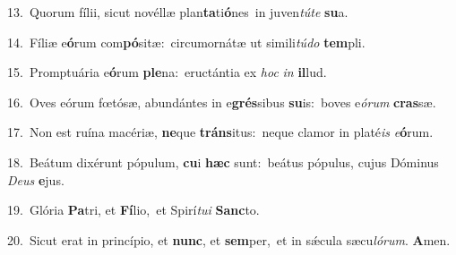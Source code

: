 {\numbfont\textcolor{\numbcolor}{13.}}~Quorum fílii, sicut novéllæ plan\-\textbf{ta}\-ti\-\textbf{ó}\-nes~\star in juven\-\textit{tú}\-\textit{te} \textbf{su}\-a.\par
{\numbfont\textcolor{\numbcolor}{14.}}~Fíliæ e\-\textbf{ó}\-rum com\-\textbf{pó}\-sitæ:~\star circumornátæ ut simili\-\textit{tú}\-\textit{do} \textbf{tem}\-pli.\par
{\numbfont\textcolor{\numbcolor}{15.}}~Promptuária e\-\textbf{ó}\-rum \textbf{ple}\-na:~\star eructántia ex \textit{hoc} \textit{in} \textbf{il}\-lud.\par
{\numbfont\textcolor{\numbcolor}{16.}}~Oves eórum fœtósæ, abundántes in e\-\textbf{grés}\-sibus \textbf{su}\-is:~\star boves e\-\textit{ó}\-\textit{rum} \textbf{cras}\-sæ.\par
{\numbfont\textcolor{\numbcolor}{17.}}~Non est ruína macériæ, \textbf{ne}\-que \textbf{tráns}\-itus:~\star neque clamor in platé\textit{is} \textit{e}\-\textbf{ó}rum.\par
{\numbfont\textcolor{\numbcolor}{18.}}~Beátum dixérunt pópulum, \textbf{cu}\-i \textbf{hæc} sunt:~\star beátus pópulus, cujus Dóminus \textit{De}\-\textit{us} \textbf{e}\-jus.\par
{\numbfont\textcolor{\numbcolor}{19.}}~Glória \textbf{Pa}\-tri, et \textbf{Fí}\-lio,~\star et Spirí\-\textit{tu}\-\textit{i} \textbf{Sanc}\-to.\par
{\numbfont\textcolor{\numbcolor}{20.}}~Sicut erat in princípio, et \textbf{nunc}\-, et \textbf{sem}\-per,~\star et in sǽcula sæcu\-\textit{ló}\-\textit{rum}. \textbf{A}\-men.\par
